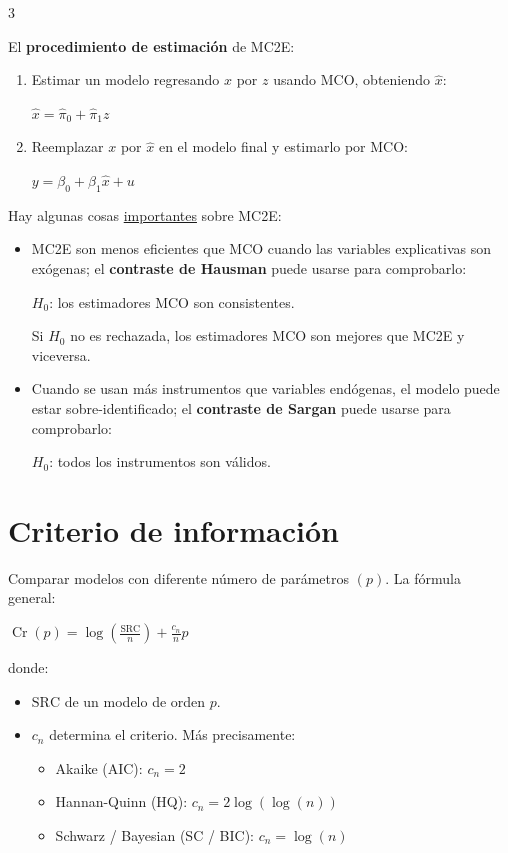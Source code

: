\documentclass[10pt, a4paper, landscape]{article}
\DeclareMathOperator{\Cr}{Cr}
\newcommand{\SSR}{\text{SRC}}
\begin{document}
\begin{multicols}{3}
\begin{itemize}[leftmargin=*]
	El \textbf{procedimiento de estimación} de MC2E:
	\begin{enumerate}[leftmargin=*]
		\item Estimar un modelo regresando \( x \) por \( z \) usando MCO, obteniendo \( \hat{x} \):
		\begin{center}
			\( \hat{x} = \hat{\pi}_{0} + \hat{\pi}_{1} z \)
		\end{center}
		\item Reemplazar \( x \) por \( \hat{x} \) en el modelo final y estimarlo por MCO:
		\begin{center}
			\( y = \beta_{0} + \beta_{1} \hat{x}+ u \)
		\end{center}
	\end{enumerate}
	Hay algunas cosas \underline{importantes} sobre MC2E:
	\begin{itemize}[leftmargin=*]
		\item MC2E son menos eficientes que MCO cuando las variables explicativas son exógenas; el \textbf{contraste de Hausman} puede usarse para comprobarlo:
		\begin{center}
			\( H_{0} \): los estimadores MCO son consistentes.
		\end{center}
		Si \( H_{0} \) no es rechazada, los estimadores MCO son mejores que MC2E y viceversa.
		\item Cuando se usan más instrumentos que variables endógenas, el modelo puede estar sobre-identificado; el \textbf{contraste de Sargan} puede usarse para comprobarlo:
		\begin{center}
			\( H_{0} \): todos los instrumentos son válidos.
		\end{center}
	\end{itemize}
\end{itemize}

\columnbreak

\section*{Criterio de información}

Comparar modelos con diferente número de parámetros \( (p) \). La fórmula general:

\begin{center}
	\( \Cr(p) = \log(\frac{\SSR}{n}) + \frac{c_{n}}{n} p \)
\end{center}

donde:

\begin{itemize}[leftmargin=*]
	\item \( \SSR \) de un modelo de orden \( p \).
	\item \( c_{n} \) determina el criterio. Más precisamente:
	\begin{itemize}[leftmargin=*]
		\item Akaike (AIC): \( c_{n} = 2 \)
		\item Hannan-Quinn (HQ): \( c_{n} = 2 \log(\log(n)) \)
		\item Schwarz / Bayesian (SC / BIC): \( c_{n} = \log(n) \)
	\end{itemize}
\end{itemize}


\end{multicols}
\end{document}
